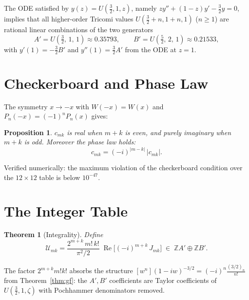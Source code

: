 \documentclass[11pt,a4paper]{article}
\newtheorem{proposition}{Proposition}[section]
\newtheorem{theorem}{Theorem}[section]
\newcommand{\Z}{\mathbb{Z}}
\begin{document}
The ODE satisfied by $y(z) = U(\tfrac32, 1, z)$,
namely $z y'' + (1-z) y' - \tfrac32 y = 0$,
implies that all higher-order Tricomi values $U(\tfrac32+n, 1+n, 1)$ ($n \ge 1$)
are rational linear combinations of the two generators
\begin{equation}\label{eq:generators}
  A' = U\!\left(\tfrac32,\,1,\,1\right) \approx 0.35793,
  \qquad
  B' = U\!\left(\tfrac52,\,2,\,1\right) \approx 0.21533,
\end{equation}
with $y'(1) = -\tfrac32 B'$ and $y''(1) = \tfrac32 A'$ from the ODE at $z=1$.

\section{Checkerboard and Phase Law}

The symmetry $x \to -x$ with $W(-x) = W(x)$ and $P_n(-x) = (-1)^n P_n(x)$ gives:

\begin{proposition}
$c_{mk}$ is real when $m+k$ is even, and purely imaginary when $m+k$ is odd.
Moreover the phase law holds:
\[
  c_{mk} = (-i)^{|m-k|}\, |c_{mk}|.
\]
\end{proposition}

Verified numerically: the maximum violation of the checkerboard condition over
the $12 \times 12$ table is below $10^{-47}$.

\section{The Integer Table}

\begin{theorem}[Integrality]\label{thm:integrality}
Define
\begin{equation}\label{eq:U}
  \mathcal{U}_{mk}
  = \frac{2^{m+k}\, m!\, k!}{\pi^2/2}\;
    \operatorname{Re}\!\bigl[(-i)^{m+k}\, J_{mk}\bigr]
  \;\in\; \Z A' \oplus \Z B'.
\end{equation}
\end{theorem}

The factor $2^{m+k} m! k!$ absorbs the structure
$[w^n](1{-}iw)^{-3/2} = (-i)^n\tfrac{(3/2)_n}{n!}$ from
Theorem~\ref{thm:gf}: the $A',B'$ coefficients are Taylor
coefficients of $U(\tfrac32, 1, \zeta)$ with Pochhammer denominators removed.
\end{document}
